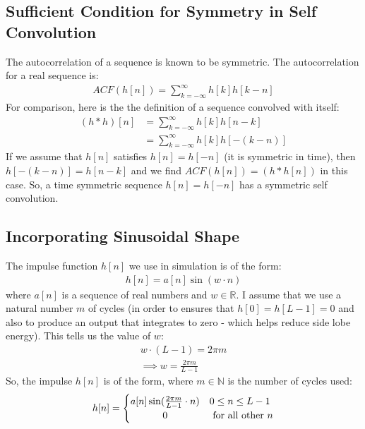 \documentclass[a4paper]{article}
\begin{document}
\subsection*{Sufficient Condition for Symmetry in Self Convolution}
The autocorrelation of a sequence is known to be symmetric. The autocorrelation for a real sequence is:
\begin{align*}
ACF(h[n]) = \sum_{k=-\infty}^{\infty}h[k]h[k-n]
\end{align*}
For comparison, here is the the definition of a sequence convolved with itself:
\begin{align*}
(h*h)[n] &= \sum_{k=-\infty}^{\infty}h[k]h[n-k] \\
&= \sum_{k=-\infty}^{\infty}h[k]h[-(k-n)]
\end{align*}
If we assume that $h[n]$ satisfies $h[n] = h[-n]$ (it is symmetric in time), then $h[-(k-n)] = h[n-k]$ and we find $ACF(h[n]) = (h*h[n])$ in this case. So, a time symmetric sequence $h[n] = h[-n]$ has a symmetric self convolution.
\subsection*{Incorporating Sinusoidal Shape}
The impulse function $h[n]$ we use in simulation is of the form:
\begin{align*}
h[n] = a[n]\sin(w \cdot n)
\end{align*}
where $a[n]$ is a sequence of real numbers and $w \in \mathbb{R}$. I assume that we use  a natural number $m$ of cycles (in order to ensures that $h[0] = h[L-1] = 0$ and also to produce an output that integrates to zero - which helps reduce side lobe energy). This tells us the value of $w$:
\begin{align*}
w \cdot (L-1) = 2 \pi m \\
\implies w = \frac{2 \pi m}{L-1}
\end{align*}
So, the impulse $h[n]$ is of the form, where $m \in \mathbb{N}$ is the number of cycles used:
\[
 h[n] =
  \begin{cases} 
      \hfill a[n]\sin(\frac{2 \pi m}{L-1} \cdot n)   \hfill & 0 \leq n \leq L -1 \\
      \hfill 0 \hfill & \text{ for all other $n$} \\
  \end{cases}
\]
\clearpage
\end{document}
